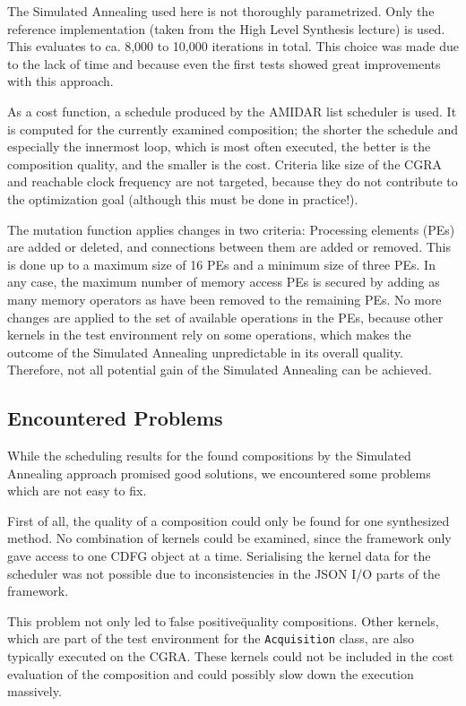 The Simulated Annealing used here is not thoroughly parametrized. Only the reference implementation (taken from the High Level Synthesis lecture) is used. This evaluates to ca. 8,000 to 10,000 iterations in total. This choice was made due to the lack of time and because even the first tests showed great improvements with this approach.

As a cost function, a schedule produced by the AMIDAR list scheduler is used. It is computed for the currently examined composition; the shorter the schedule and especially the innermost loop, which is most often executed, the better is the composition quality, and the smaller is the cost. Criteria like size of the CGRA and reachable clock frequency are not targeted, because they do not contribute to the optimization goal (although this must be done in practice!).

The mutation function applies changes in two criteria: Processing elements (PEs) are added or deleted, and connections between them are added or removed. This is done up to a maximum size of 16 PEs and a minimum size of three PEs. In any case, the maximum number of memory access PEs is secured by adding as many memory operators as have been removed to the remaining PEs. No more changes are applied to the set of available operations in the PEs, because other kernels in the test environment rely on some operations, which makes the outcome of the Simulated Annealing unpredictable in its overall quality. Therefore, not all potential gain of the Simulated Annealing can be achieved.

\subsection{Encountered Problems}
\label{subsec:problemsSA}

While the scheduling results for the found compositions by the Simulated Annealing approach promised good solutions, we encountered some problems which are not easy to fix.

First of all, the quality of a composition could only be found for one synthesized method. No combination of kernels could be examined, since the framework only gave access to one CDFG object at a time. Serialising the kernel data for the scheduler was not possible due to inconsistencies in the JSON I/O parts of the framework. 

This problem not only led to \"false positive\" quality compositions. Other kernels, which are part of the test environment for the \texttt{Acquisition} class, are also typically executed on the CGRA. These kernels could not be included in the cost evaluation of the composition and could possibly slow down the execution massively. 

